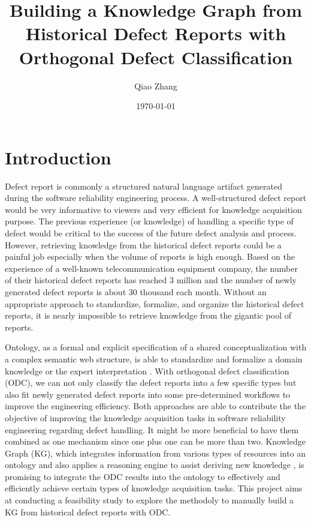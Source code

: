 \documentclass[12pt] {article}
\begin{document}
\title{Building a Knowledge Graph from Historical Defect Reports with Orthogonal Defect Classification}
\author{Qiao Zhang}
\date \today
\maketitle

\thispagestyle{empty}

\bigskip
\pagebreak
\setcounter{page}{1}
\section{Introduction}
Defect report is commonly a structured natural language artifact generated during the software reliability engineering process.
A well-structured defect report would be very informative to viewers and very efficient for knowledge acquisition purpose.
The previous experience (or knowledge) of handling a specific type of defect would be critical to the success of the future defect analysis and process.
However, retrieving knowledge from the historical defect reports could be a painful job especially when the volume of reports is high enough.
Based on the experience of a well-known telecommunication equipment company, the number of their historical defect reports has reached 3 million and the number of newly generated defect reports is about 30 thousand each month.
Without an appropriate approach to standardize, formalize, and organize the historical defect reports, it is nearly impossible to retrieve knowledge from the gigantic pool of reports.\par

Ontology, as a formal and explicit specification of a shared conceptualization with a complex semantic web structure, is able to standardize and formalize a domain knowledge or the expert interpretation \cite{christina2016an}.
With orthogonal defect classification (ODC), we can not only classify the defect reports into a few specific types but also fit newly generated defect reports into some pre-determined workflows to improve the engineering efficiency.
Both approaches are able to contribute the the objective of improving the knowledge acquisition tasks in software reliability engineering regarding defect handling. 
It might be more beneficial to have them combined as one mechanism since one plus one can be more than two.
Knowledge Graph (KG), which integrates information from various types of resources into an ontology and also applies a reasoning engine to assist deriving new knowledge \cite{ehrlinger2016towards}, is promising to integrate the ODC results into the ontology to effectively and efficiently achieve certain types of knowledge acquisition tasks.
This project aims at conducting a feasibility study to explore the methodoly to manually build a KG from historical defect reports with ODC.
\end{document}
